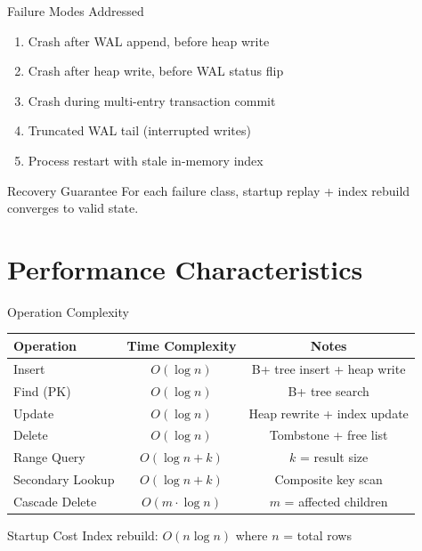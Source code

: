 \documentclass[aspectratio=169]{beamer}
\begin{document}
\begin{frame}{Failure Modes Addressed}
\begin{enumerate}
  \item Crash after WAL append, before heap write
  \item Crash after heap write, before WAL status flip
  \item Crash during multi-entry transaction commit
  \item Truncated WAL tail (interrupted writes)
  \item Process restart with stale in-memory index
\end{enumerate}

\vspace{0.5cm}
\begin{block}{Recovery Guarantee}
For each failure class, startup replay + index rebuild converges to valid state.
\end{block}
\end{frame}

\section{Performance Characteristics}

\begin{frame}{Operation Complexity}
\begin{table}
\begin{tabular}{l|c|c}
\textbf{Operation} & \textbf{Time Complexity} & \textbf{Notes} \\
\hline
Insert & $O(\log n)$ & B+ tree insert + heap write \\
Find (PK) & $O(\log n)$ & B+ tree search \\
Update & $O(\log n)$ & Heap rewrite + index update \\
Delete & $O(\log n)$ & Tombstone + free list \\
Range Query & $O(\log n + k)$ & $k$ = result size \\
Secondary Lookup & $O(\log n + k)$ & Composite key scan \\
Cascade Delete & $O(m \cdot \log n)$ & $m$ = affected children \\
\hline
\end{tabular}
\end{table}

\vspace{0.3cm}
\begin{alertblock}{Startup Cost}
Index rebuild: $O(n \log n)$ where $n$ = total rows
\end{alertblock}
\end{frame}
\end{document}
